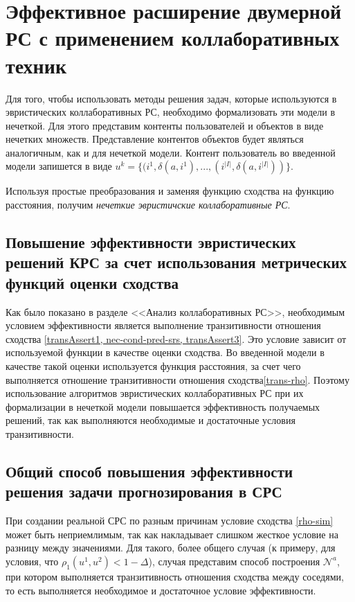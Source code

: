 \section{Эффективное расширение двумерной РС с применением коллаборативных
техник}
Для того, чтобы использовать методы решения задач, которые используются в эвристических коллаборативных РС, необходимо
формализовать эти модели в нечеткой. Для этого представим контенты пользователей и объектов в виде нечетких множеств.
Представление контентов объектов будет являться аналогичным, как и для нечеткой модели. Контент пользователь во введенной модели запишется в виде
$u^k = \{ (i^1, \delta(a,i^1), ...,(i^{|I|}, \delta(a,i^{|I|}) ) \}$. 

\begin{assert}
Используя простые преобразования и заменяя функцию сходства на функцию расстояния, получим {\it нечеткие эвристичские коллаборативные РС}.
\end{assert}

\subsection{Повышение эффективности эвристических решений КРС за счет  использования метрических функций оценки сходства}
Как было показано в разделе <<Анализ коллаборативных РС>>, необходимым условием эффективности является выполнение 
транзитивности отношения сходства \ref{transAssert1, nec-cond-pred-srs, transAssert3}.
Это условие зависит от используемой функции в качестве оценки сходства. Во введенной модели в качестве такой оценки
используется функция расстояния, за счет чего выполняется отношение транзитивности отношения сходства\ref{trans-rho}. 
Поэтому использование алгоритмов эвристических коллаборативных РС при их формализации в нечеткой модели 
повышается эффективность получаемых решений, так как выполняются необходимые и  достаточные условия транзитивности. 

\subsection{Общий способ повышения эффективности решения задачи прогнозирования в СРС}
При создании реальной СРС по разным причинам условие сходства \ref{rho-sim} %
может быть неприемлимым, так как накладывает слишком жесткое условие на разницу между значениями. Для такого, более общего случая 
(к примеру, для условия, что $\rho_1(u^1, u^2) < 1 - \Delta$), случая представим способ построения $\mathcal{N}^a$, при котором 
выполняется транзитивность отношения сходства между соседями, то есть выполняется необходимое и достаточное условие эффективности. 

